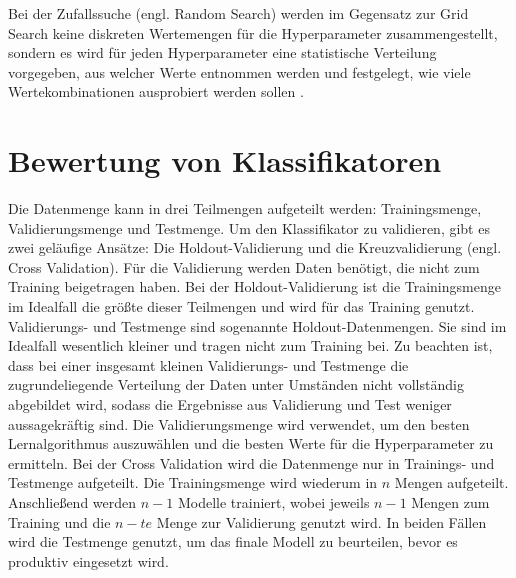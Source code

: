 Bei der Zufallssuche (engl. Random Search) werden im Gegensatz zur Grid Search keine diskreten Wertemengen für die Hyperparameter zusammengestellt, sondern es wird für jeden Hyperparameter eine statistische Verteilung vorgegeben, aus welcher Werte entnommen werden und festgelegt, wie viele Wertekombinationen ausprobiert werden sollen \cite{burkov_machine_2019}. 


\section{Bewertung von Klassifikatoren}\label{sec:metriken}

Die Datenmenge kann in drei Teilmengen aufgeteilt werden: Trainingsmenge, Validierungsmenge und Testmenge. Um den Klassifikator zu validieren, gibt es zwei geläufige Ansätze: Die Holdout-Validierung und die Kreuzvalidierung (engl. Cross Validation). Für die Validierung werden Daten benötigt, die nicht zum Training beigetragen haben. Bei der Holdout-Validierung ist die Trainingsmenge im Idealfall die größte dieser Teilmengen und wird für das Training genutzt. Validierungs- und Testmenge sind sogenannte Holdout-Datenmengen. Sie sind im Idealfall wesentlich kleiner und tragen nicht zum Training bei. Zu beachten ist, dass bei einer insgesamt kleinen Validierungs- und Testmenge die zugrundeliegende Verteilung der Daten unter Umständen nicht vollständig abgebildet wird, sodass die Ergebnisse aus Validierung und Test weniger aussagekräftig sind. Die Validierungsmenge wird verwendet, um den besten Lernalgorithmus auszuwählen und die besten Werte für die Hyperparameter zu ermitteln. Bei der Cross Validation wird die Datenmenge nur in Trainings- und Testmenge aufgeteilt. Die Trainingsmenge wird wiederum in $n$ Mengen aufgeteilt. Anschließend werden $n-1$ Modelle trainiert, wobei jeweils $n-1$ Mengen zum Training und die $n-te$ Menge zur Validierung genutzt wird. In beiden Fällen wird die Testmenge  genutzt, um das finale Modell zu beurteilen, bevor es produktiv eingesetzt wird. \cite{burkov_machine_2019}

